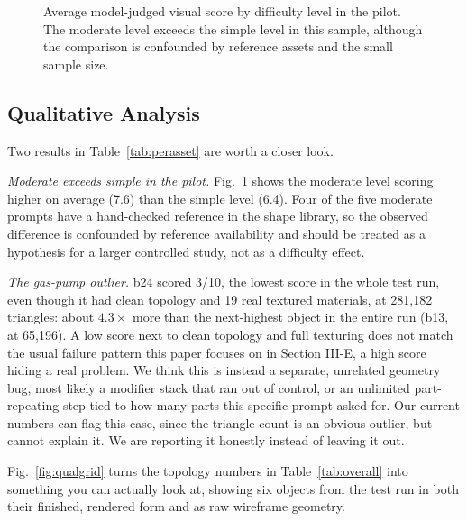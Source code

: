 \documentclass[conference]{IEEEtran}
\begin{document}
\begin{figure}[t]
\centering
{}
\caption{Average model-judged visual score by difficulty level in the pilot. The moderate level exceeds the simple level in this sample, although the comparison is confounded by reference assets and the small sample size.}
\label{fig:tierbar}
\end{figure}

\subsection{Qualitative Analysis}
\label{sec:qualitative}
Two results in Table~\ref{tab:perasset} are worth a closer look.

\emph{Moderate exceeds simple in the pilot.} Fig.~\ref{fig:tierbar} shows the moderate level scoring higher on average (7.6) than the simple level (6.4). Four of the five moderate prompts have a hand-checked reference in the shape library, so the observed difference is confounded by reference availability and should be treated as a hypothesis for a larger controlled study, not as a difficulty effect.

\emph{The gas-pump outlier.} b24 scored 3/10, the lowest score in the whole test run, even though it had clean topology and 19 real textured materials, at 281{,}182 triangles: about $4.3\times$ more than the next-highest object in the entire run (b13, at 65{,}196). A low score next to clean topology and full texturing does not match the usual failure pattern this paper focuses on in Section III-E, a high score hiding a real problem. We think this is instead a separate, unrelated geometry bug, most likely a modifier stack that ran out of control, or an unlimited part-repeating step tied to how many parts this specific prompt asked for. Our current numbers can flag this case, since the triangle count is an obvious outlier, but cannot explain it. We are reporting it honestly instead of leaving it out.

Fig.~\ref{fig:qualgrid} turns the topology numbers in Table~\ref{tab:overall} into something you can actually look at, showing six objects from the test run in both their finished, rendered form and as raw wireframe geometry.
\end{document}

